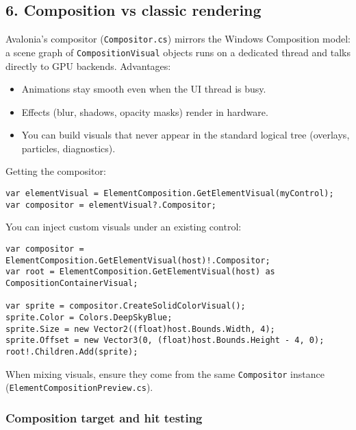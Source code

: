\subsection{6. Composition vs classic
rendering}\label{composition-vs-classic-rendering}

Avalonia's compositor (\passthrough{\lstinline!Compositor.cs!}) mirrors
the Windows Composition model: a scene graph of
\passthrough{\lstinline!CompositionVisual!} objects runs on a dedicated
thread and talks directly to GPU backends. Advantages:

\begin{itemize}
\tightlist
\item
  Animations stay smooth even when the UI thread is busy.
\item
  Effects (blur, shadows, opacity masks) render in hardware.
\item
  You can build visuals that never appear in the standard logical tree
  (overlays, particles, diagnostics).
\end{itemize}

Getting the compositor:

\begin{lstlisting}
var elementVisual = ElementComposition.GetElementVisual(myControl);
var compositor = elementVisual?.Compositor;
\end{lstlisting}

You can inject custom visuals under an existing control:

\begin{lstlisting}
var compositor = ElementComposition.GetElementVisual(host)!.Compositor;
var root = ElementComposition.GetElementVisual(host) as CompositionContainerVisual;

var sprite = compositor.CreateSolidColorVisual();
sprite.Color = Colors.DeepSkyBlue;
sprite.Size = new Vector2((float)host.Bounds.Width, 4);
sprite.Offset = new Vector3(0, (float)host.Bounds.Height - 4, 0);
root!.Children.Add(sprite);
\end{lstlisting}

When mixing visuals, ensure they come from the same
\passthrough{\lstinline!Compositor!} instance
(\passthrough{\lstinline!ElementCompositionPreview.cs!}).

\subsubsection{Composition target and hit
testing}\label{composition-target-and-hit-testing}

